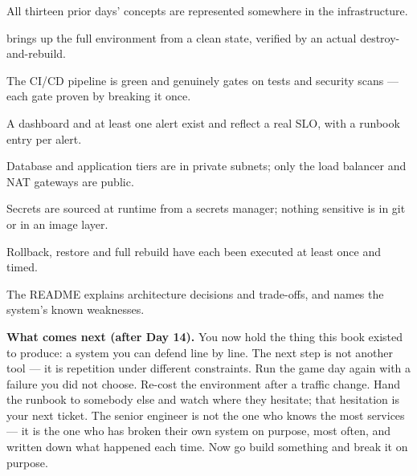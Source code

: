 \begin{checklist}
  \item All thirteen prior days' concepts are represented somewhere in the infrastructure.
  \item {} brings up the full environment from a clean state, verified by an actual destroy-and-rebuild.
  \item The CI/CD pipeline is green and genuinely gates on tests and security scans --- each gate proven by breaking it once.
  \item A dashboard and at least one alert exist and reflect a real SLO, with a runbook entry per alert.
  \item Database and application tiers are in private subnets; only the load balancer and NAT gateways are public.
  \item Secrets are sourced at runtime from a secrets manager; nothing sensitive is in git or in an image layer.
  \item Rollback, restore and full rebuild have each been executed at least once and timed.
  \item The README explains architecture decisions and trade-offs, and names the system's known weaknesses.
\end{checklist}

\begin{keyidea}
\textbf{What comes next (after Day 14).} You now hold the thing this book existed to produce: a system you can defend line by line. The next step is not another tool --- it is repetition under different constraints. Run the game day again with a failure you did not choose. Re-cost the environment after a traffic change. Hand the runbook to somebody else and watch where they hesitate; that hesitation is your next ticket. The senior engineer is not the one who knows the most services --- it is the one who has broken their own system on purpose, most often, and written down what happened each time. Now go build something and break it on purpose.
\end{keyidea}

